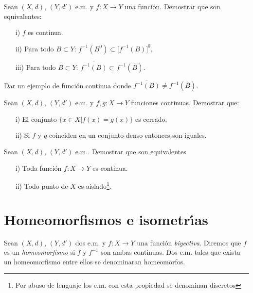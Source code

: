 \begin{ejercicio}{} Sean $(X,d)$, $(Y,d')$ e.m. y $f:X\rightarrow Y$
una función. Demostrar que son equivalentes:
\begin{itemize}
\item[i)] $f$ es continua.
\item[ii)] Para todo $B\subset Y$: $f^{-1}(B^0)\subset
\bigl[f^{-1}(B)\bigr]^0$.
\item[iii)]Para todo $B\subset Y$: $\overline{f^{-1}(B)}\subset
f^{-1}(\overline{B})$.
\end{itemize}
Dar un ejemplo de función continua donde
$\overline{f^{-1}(B)}\neq f^{-1}(\overline{B})$.
\end{ejercicio}

\begin{ejercicio}{} Sean $(X,d)$, $(Y,d')$ e.m. y $f,g:X\rightarrow Y$
 funciones continuas. Demostrar que:
 \begin{itemize}
    \item[i)]  El conjunto $\{x\in X| f(x)=g(x)\}$ es cerrado.
    \item[ii)] Si $f$ y $g$ coinciden en un conjunto denso
    entonces son iguales.
 \end{itemize}
 \end{ejercicio}

\begin{ejercicio}{} Sean $(X,d)$, $(Y,d')$ e.m.. Demostrar que son equivalentes
\begin{itemize}
    \item[i)] Toda función $f:X\rightarrow Y$ es continua.
    \item[ii)] Todo punto de $X$ es aislado\footnote{Por abuso de
    lenguaje los e.m. con esta propiedad se denominan discretos}.
\end{itemize}
\end{ejercicio}


\section{Homeomorfismos e isometr\'{\i}as}

\begin{definicion}{} Sean $(X,d)$, $(Y,d')$ dos e.m. y
$f:X\rightarrow Y$ una función \emph{biyectiva}. Diremos que $f$
es un \emph{homeomorfismo} si $f$ y $f^{-1}$ son ambas continuas.
Dos e.m. tales que exista un homeomorfismo entre ellos se
denominaran homeomorfos.
\end{definicion}

